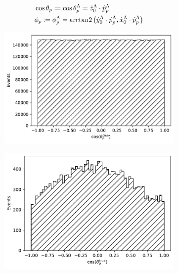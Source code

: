 \begin{subequations}
	\label{eq:5:helicity_angles}
	\begin{align}
		&\cos\theta_p \coloneqq \cos\theta_p^\Lambda
		=
		\hat{z}_0^\Lambda \cdot \hat{p}_p^\Lambda
		\label{eq:5:helicity_theta} \\
		&\phi_p \coloneqq \phi_p^\Lambda
		=
		\operatorname{arctan2}
		\left(
			\hat{y}_0^\Lambda \cdot \hat{p}_p^\Lambda,
			\hat{x}_0^\Lambda \cdot \hat{p}_p^\Lambda
		\right)
		\label{eq:5:helicity_phi}
	\end{align}
\end{subequations}

\begin{figure}[t]
	\centering
	\begin{subfigure}{.45\textwidth}
		\includegraphics[height=.2\textheight]{graphics/05-angular_distributions/MCTRUTH_theta_true.pdf}
		\caption{}
		\label{fig:5:MCTRUTH_theta_true}
	\end{subfigure}
	\begin{subfigure}{.45\textwidth}
		\includegraphics[height=.2\textheight]{graphics/05-angular_distributions/MCRECO_theta_true.pdf}

\end{subfigure}
\end{figure}
